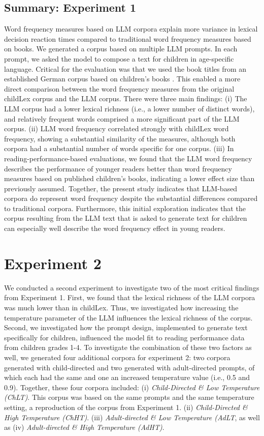 \documentclass[doc, a4paper]{apa7}
\begin{document}
\subsection{Summary: Experiment 1}

Word frequency measures based on LLM corpora explain more variance in lexical decision reaction times compared to traditional word frequency measures based on books. We generated a corpus based on multiple LLM prompts. In each prompt, we asked the model to compose a text for children in age-specific language. Critical for the evaluation was that we used the book titles from an established German corpus based on children's books \citep[childLex; ][]{schroeder_childlex_2015}. This enabled a more direct comparison between the word frequency measures from the original childLex corpus and the LLM corpus. There were three main findings: (i) The LLM corpus had a lower lexical richness (i.e., a lower number of distinct words), and relatively frequent words comprised a more significant part of the LLM corpus. (ii) LLM word frequency correlated strongly with childLex word frequency, showing a substantial similarity of the measures, although both corpora had a substantial number of words specific for one corpus. (iii) In reading-performance-based evaluations, we found that the LLM word frequency describes the performance of younger readers better than word frequency measures based on published children's books, indicating a lower effect size than previously assumed. Together, the present study indicates that LLM-based corpora do represent word frequency despite the substantial differences compared to traditional corpora. Furthermore, this initial exploration indicates that the corpus resulting from the LLM text that is asked to generate text for children can especially well describe the word frequency effect in young readers.  


\section{Experiment 2}

We conducted a second experiment to investigate two of the most critical findings from Experiment 1. First, we found that the lexical richness of the LLM corpora was much lower than in childLex. Thus, we investigated how increasing the temperature parameter of the LLM influences the lexical richness of the corpus. Second, we investigated how the prompt design, implemented to generate text specifically for children, influenced the model fit to reading performance data from children grades 1-4. To investigate the combination of these two factors as well, we generated four additional corpora for experiment 2: two corpora generated with child-directed and two generated with adult-directed prompts, of which each had the same and one an increased temperature value (i.e., 0.5 and 0.9). Together, these four corpora included: (i) \textit{Child-Directed \& Low Temperature (ChLT)}. This corpus was based on the same prompts and the same temperature setting, a reproduction of the corpus from Experiment 1. (ii) \textit{Child-Directed \& High Temperature (ChHT)}. (iii) \textit{Adult-directed \& Low Temperature (AdLT}, as well as (iv) \textit{Adult-directed \& High Temperature (AdHT)}.
\end{document}

